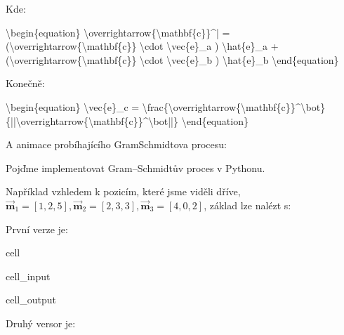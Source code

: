 \documentclass[letterpaper,10pt,english]{jupyterBook}
\begin{document}
\sphinxAtStartPar
Kde:

\textbackslash{}begin\{equation\}
\textbackslash{}overrightarrow\{\textbackslash{}mathbf\{c\}\}\textasciicircum{}| = (\textbackslash{}overrightarrow\{\textbackslash{}mathbf\{c\}\} \textbackslash{}cdot \textbackslash{}vec\{e\}\_a ) \textbackslash{}hat\{e\}\_a + (\textbackslash{}overrightarrow\{\textbackslash{}mathbf\{c\}\} \textbackslash{}cdot \textbackslash{}vec\{e\}\_b ) \textbackslash{}hat\{e\}\_b
\textbackslash{}end\{equation\}


\sphinxAtStartPar
Konečně:

\textbackslash{}begin\{equation\}
\textbackslash{}vec\{e\}\_c = \textbackslash{}frac\{\textbackslash{}overrightarrow\{\textbackslash{}mathbf\{c\}\}\textasciicircum{}\textbackslash{}bot\}\{||\textbackslash{}overrightarrow\{\textbackslash{}mathbf\{c\}\}\textasciicircum{}\textbackslash{}bot||\}
\textbackslash{}end\{equation\}


\sphinxAtStartPar
A animace probíhajícího Gram\sphinxhyphen{}Schmidtova procesu:



\sphinxAtStartPar
Pojďme implementovat Gram–Schmidtův proces v Pythonu.

\sphinxAtStartPar
Například vzhledem k pozicím, které jsme viděli dříve, \(\overrightarrow{\mathbf{m}}_1 = [1,2,5], \overrightarrow{\mathbf{m}}_2 = [2,3,3], \overrightarrow{\mathbf{m}}_3 = [4,0,2]\), základ lze nalézt s:

\sphinxAtStartPar
První verze je:

\begin{sphinxuseclass}{cell}\begin{sphinxVerbatimInput}

\begin{sphinxuseclass}{cell_input}
\begin{sphinxVerbatim}[commandchars=\\\{\}]
  
\end{sphinxVerbatim}

\end{sphinxuseclass}\end{sphinxVerbatimInput}
\begin{sphinxVerbatimOutput}

\begin{sphinxuseclass}{cell_output}
\begin{sphinxVerbatim}[commandchars=\\\{\}]
[0.18257419 0.36514837 0.91287093]
\end{sphinxVerbatim}

\end{sphinxuseclass}\end{sphinxVerbatimOutput}

\end{sphinxuseclass}
\sphinxAtStartPar
Druhý versor je:
\end{document}
